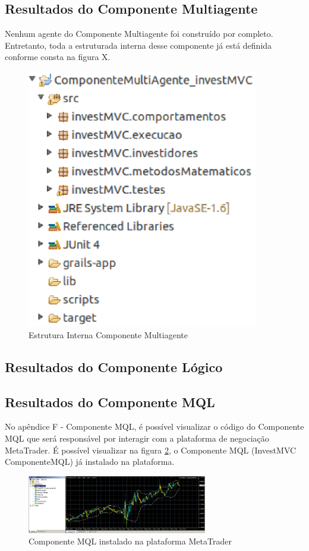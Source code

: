 \subsection{Resultados do Componente Multiagente}

Nenhum agente do Componente Multiagente foi construído por completo. Entretanto, toda a estruturada interna desse componente já está definida conforme consta na figura X.

\begin{figure}[htp]
\centering
\includegraphics[width=0.9\textwidth]{figuras/estruturaSMA}
\caption{ Estrutura Interna Componente Multiagente}
\label{estruturaSMA}
\end{figure}

\subsection{Resultados do Componente Lógico}
\subsection{Resultados do Componente MQL}

No apêndice F - Componente MQL, é possível visualizar o código do Componente MQL que será responsável por interagir com a plataforma de negociação MetaTrader. É possível visualizar na figura \ref{componenteMQL}, o Componente MQL  (InvestMVC ComponenteMQL) já instalado na plataforma.

\begin{figure}[htp]
\centering
\includegraphics[width=0.7\textwidth]{figuras/componenteMQL}
\caption{Componente MQL instalado na plataforma MetaTrader}
\label{componenteMQL}
\end{figure}